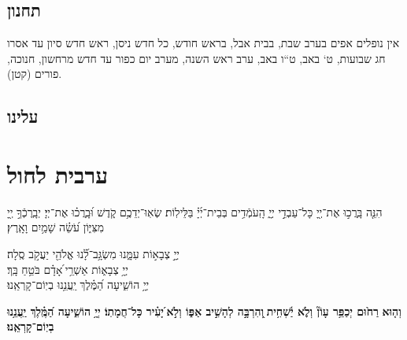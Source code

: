 \documentclass[twoside, openany, parskip=half, 11pt]{book}
\begin{document}
\section*{ תחנון }

\begin{scriptsize}
\textsf{אין נופלים אפים  בערב שבת, בבית אבל, בראש חודש, כל חדש ניסן, ראש חדש סיון עד אסרו חג שבועות, ט` באב, ט``ו באב,  ערב ראש השנה, מערב יום כפור עד חדש מרחשון, חנוכה, פורים (קטן).}

\end{scriptsize}


\nefilasapayim

\nextpage
\shomeryisroel 

\fullkaddish

\vspace{\baselineskip}

\label{mincha aleinu}
\section*{ עלינו }


\aleinu


\vfill

\quad{}\quad{}

\chapter[ערבית לחול]{ ערבית לחול }

הִנֵּ֤ה בָּֽרֲכ֣וּ אֶת־יְ֖יָ כָּל־עַבְדֵ֣י יְיָ֑ הָֽעֹמְֿדִ֥ים בְּבֵית־יְ֜יָ֗ בַּלֵּילֽוֹת׃ שְׂאֽוּ־יְדֵכֶ֥ם קֹ֑דֶשׁ וּ֝בָֽרֲכ֗וּ אֶת־יְיָ׃ יְבָֽרֶכְֿךָ֣ יְ֖יָ מִצִּיּ֑וֹן עֹ֝שֵׂ֗ה שָׁמַ֥יִם וָאָֽרֶץ׃
 
 יְיָ֣ צְבָא֣וֹת עִמָּ֑נוּ מִשְׂגָּ֥ב־לָ֝֗נוּ אֱלֹהֵ֖י יַעֲקֹ֣ב סֶֽלָה׃ 	 \hfill	
  \\ 
יְיָ֥ צְבָא֑וֹת אַשְׁרֵ֥י ֝אָדָ֗ם בֹּטֵ֥חַ בָּֽךְ׃  \hfill 
{} \\
 יְיָ֥ הוֹשִׁ֑יעָה הַ֝מֶּ֗לֶךְ יַֽעֲנֵ֥נוּ בְיֽוֹם־קָרְאֵֽנוּ׃  \hfill {}


\halfkaddish
 

\textbf{וְה֤וּא}\textbf{
 רַח֙וּם יְכַפֵּ֥ר עָוֹן֘ וְלֹ֢א יַ֫שְׁחִ֥ית ֖וְהִרְבָּ֣ה לְהָשִׁ֣יב אַפּ֑וֹ וְלֹ֣א ֝יָעִ֗יר כָּל־חֲמָתֽוֹ׃ יְיָ֥ הוֹשִׁ֑יעָה הַ֝מֶּֽ֗לֶךְ יַֽעֲנֵ֥נוּ בְיֽוֹם־קָרְאֵֽנוּ׃}
\end{document}
